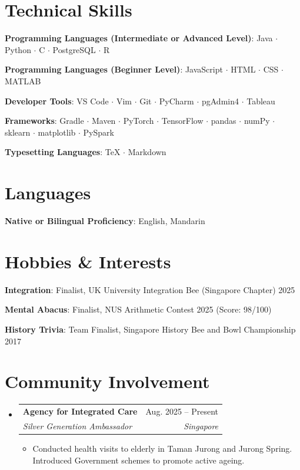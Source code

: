 \documentclass[letterpaper,7pt]{article}
\makeatletter
\newcommand{\resumeItem}[1]{\item\small{{#1 \vspace{-2pt}}}}
\newcommand{\resumeSubheading}[4]{
  \vspace{-3pt}\item
  \begin{tabular*}{0.97\textwidth}[t]{l@{\extracolsep{\fill}}r}
    \textbf{#1} & #2 \\
    \textit{\small#3} & \textit{\small #4} \\
  \end{tabular*}\vspace{-8pt}
}
\newenvironment{resumeSubHeadingList}{\begin{itemize}[leftmargin=0.15in, label={}]}{\end{itemize}}
\newenvironment{resumeItemList}{\begin{itemize}}{\end{itemize}}
\makeatother
\begin{document}
\section{Technical Skills}
\begin{itemize}[leftmargin=0.15in,label={$\star$},itemsep=-0.3em]
    \small{\item{\textbf{Programming Languages (Intermediate or Advanced Level)}{: Java $\cdot$ Python $\cdot$ C $\cdot$ PostgreSQL $\cdot$ R}}}
    \small{\item{\textbf{Programming Languages (Beginner Level)}{: JavaScript $\cdot$ HTML $\cdot$ CSS $\cdot$ MATLAB}}}
    \small{\item{\textbf{Developer Tools}{: VS Code $\cdot$ Vim $\cdot$ Git $\cdot$ PyCharm $\cdot$ pgAdmin4 $\cdot$ Tableau}}}
    \small{\item{\textbf{Frameworks}{: Gradle $\cdot$ Maven $\cdot$ PyTorch $\cdot$ TensorFlow $\cdot$ pandas $\cdot$ numPy $\cdot$ sklearn $\cdot$ matplotlib $\cdot$ PySpark}}}
    \small{\item{\textbf{Typesetting Languages}{: TeX $\cdot$ Markdown}}}
\end{itemize}

\section{Languages}
\begin{itemize}[leftmargin=0.15in,label={$\star$},itemsep=-0.3em]
    \small{\item{\textbf{Native or Bilingual Proficiency}{: English, Mandarin}}}
\end{itemize}

\section{Hobbies \& Interests}
\begin{itemize}[leftmargin=0.15in,label={$\star$},itemsep=-0.3em]
    \small{\item{\textbf{Integration}{: Finalist, UK University Integration Bee (Singapore Chapter) 2025}}}
    \small{\item{\textbf{Mental Abacus}{: Finalist, NUS Arithmetic Contest 2025 (Score: 98/100)}}}
    \small{\item{\textbf{History Trivia}{: Team Finalist, Singapore History Bee and Bowl Championship 2017}}}
\end{itemize}

\section{Community Involvement}
\begin{resumeSubHeadingList}
\resumeSubheading{Agency for Integrated Care}{Aug. 2025 -- Present}{Silver Generation Ambassador}{Singapore}
\begin{resumeItemList}
    \resumeItem{Conducted health visits to elderly in Taman Jurong and Jurong Spring. Introduced Government schemes to promote active ageing.}
\end{resumeItemList}
\end{resumeSubHeadingList}
\end{document}
